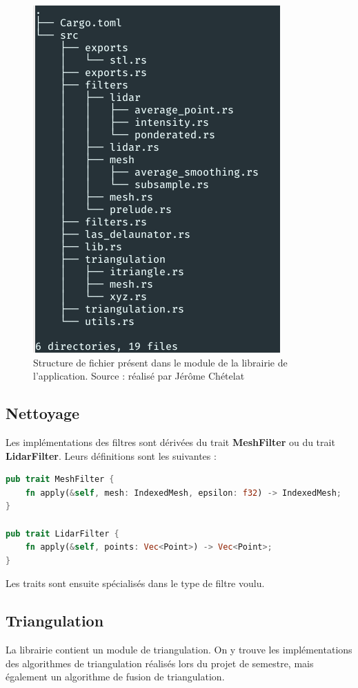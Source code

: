\begin{figure}[htbp!]
    \centering
    \includegraphics[width=0.5\linewidth]{figures/architecture.png}
    \caption{Structure de fichier présent dans le module de la librairie de l'application. Source : réalisé par Jérôme Chételat}
    \label{fig:library_tree}
\end{figure}

\subsection{Nettoyage}

Les implémentations des filtres sont dérivées du trait \textbf{MeshFilter} ou du trait \textbf{LidarFilter}. Leurs définitions sont les suivantes :
\begin{lstlisting}[language=Rust, style=boxed]
pub trait MeshFilter {
    fn apply(&self, mesh: IndexedMesh, epsilon: f32) -> IndexedMesh;
}

pub trait LidarFilter {
    fn apply(&self, points: Vec<Point>) -> Vec<Point>;
}

\end{lstlisting}

Les traits sont ensuite spécialisés dans le type de filtre voulu.
\subsection{Triangulation}

La librairie contient un module de triangulation.
On y trouve les implémentations des algorithmes de triangulation réalisés lors
du projet de semestre, mais également un algorithme de fusion de triangulation.

